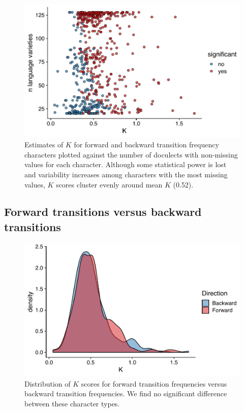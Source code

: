 \begin{figure}

{\centering \includegraphics[width=0.66\linewidth]{fig/k-scatterplot} 

}

\caption{Estimates of $K$ for forward and backward transition frequency characters plotted against the number of doculects with non-missing values for each character. Although some statistical power is lost and variability increases among characters with the most missing values, $K$ scores cluster evenly around mean $K$ (0.52).}\label{fig:k-scatterplot}
\end{figure}

\hypertarget{fwd-vs-bkwd}{%
\subsection{Forward transitions versus backward transitions}\label{fwd-vs-bkwd}}

\begin{figure}

{\centering \includegraphics[width=0.66\linewidth]{fig/k-fwd-bkwd} 

}

\caption{Distribution of $K$ scores for forward transition frequencies versus backward transition frequencies. We find no significant difference between these character types.}\label{fig:k-fwd-vs-bkwd}
\end{figure}

